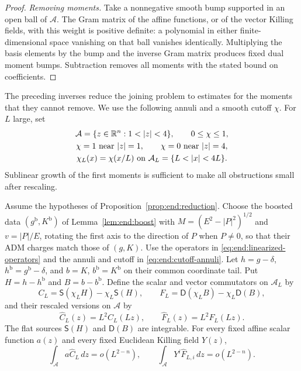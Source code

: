 \begin{proof}
\emph{Removing moments.} Take a nonnegative smooth bump supported in
an open ball
of $\mathcal A$.  The Gram matrix of the affine functions, or
of the vector Killing fields, with this weight is positive
definite: a polynomial in either finite-dimensional space
vanishing on that ball vanishes identically.  Multiplying the
basis elements by the bump and the inverse Gram matrix produces
fixed dual moment bumps.  Subtraction removes all moments with
the stated bound on coefficients.
\end{proof}

The preceding inverses reduce the joining problem to estimates for
the moments that they cannot remove.  We use the following annuli
and a smooth cutoff $\chi$.  For $L$ large, set
\begin{equation}\label{eq:end:cutoff-annuli}
\begin{gathered}
 \mathcal A=\{z\in\R^n:1<|z|<4\},\qquad 0\le\chi\le1,\\
 \chi=1\text{ near }|z|=1,\qquad
 \chi=0\text{ near }|z|=4,\\
 \chi_L(x)=\chi(x/L)\text{ on }\mathcal A_L=\{L<|x|<4L\}.
\end{gathered}
\end{equation}
Sublinear growth of the first moments is sufficient to make all
obstructions small after rescaling.

\begin{lemma}\label{lem:end:moments}
Assume the hypotheses of Proposition~\ref{prop:end:reduction}.
Choose the boosted data $(g^{\mathrm b},K^{\mathrm b})$ of
Lemma~\ref{lem:end:boost} with $M=(E^2-|P|^2)^{1/2}$ and $v=|P|/E$,
rotating the first axis to the direction of $P$ when $P\ne0$, so that
their ADM charges match those of $(g,K)$.  Use the operators in
\eqref{eq:end:linearized-operators} and the annuli and cutoff in
\eqref{eq:end:cutoff-annuli}.
Let $h=g-\delta$, $h^{\mathrm b}=g^{\mathrm b}-\delta$, and
$b=K$, $b^{\mathrm b}=K^{\mathrm b}$ on their common coordinate
tail. Put $H=h-h^{\mathrm b}$ and $B=b-b^{\mathrm b}$. Define
the scalar and vector commutators on $\mathcal A_L$ by
\[
 C_L=\mathsf S(\chi_LH)-\chi_L\mathsf S(H),\qquad
 F_L=\mathsf D(\chi_LB)-\chi_L\mathsf D(B),
\]
and their rescaled versions on $\mathcal A$ by
\[
 \widehat C_L(z)=L^2C_L(Lz),\qquad
 \widehat F_L(z)=L^2F_L(Lz).
\]
The flat sources $\mathsf S(H)$ and $\mathsf D(B)$ are integrable.
For every fixed affine scalar function $a(z)$ and every fixed
Euclidean Killing field $Y(z)$,
\[
 \int_{\mathcal A}a\widehat C_L\,dz=o(L^{2-n}),\qquad
 \int_{\mathcal A}Y^i\widehat F_{L,i}\,dz=o(L^{2-n}).
\]
\end{lemma}

